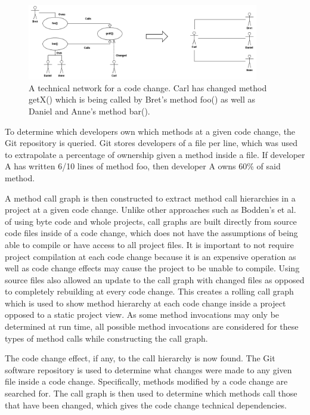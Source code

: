 \begin{figure}[ht]
\centering
\includegraphics[width=0.9\textwidth]{figures/TecNetwork}
\caption{A technical network for a code change. Carl has changed method getX() which is being
called by Bret's method foo() as well as Daniel and Anne's method bar().\label{fig:network}}
\end{figure}

To determine which developers own which methods at a given code change,
the Git repository is queried. Git stores developers of a file per line, which was used to extrapolate
a percentage of ownership given a method inside a file. If developer A has written 6/10 lines of 
method foo, then developer A owns 60\% of said method.

A method call graph is then constructed to extract method call hierarchies in a project at a given code change. 
Unlike other approaches such as Bodden's et al.~\cite{Bodden:2003:HVJ} 
of using byte code and whole projects, call graphs are built directly from source code files
inside of a code change, 
which does not have the assumptions of being able to compile or have access to all project 
files. It is important to not require project compilation at each code change because it is
an expensive operation as well as code change effects may cause the project
to be unable to compile. Using source files also allowed an update to the call graph
with changed files as opposed to completely rebuilding at 
every code change. This creates a rolling call graph which 
is used to show method hierarchy at each code change inside a project opposed to
a static project view. As some method invocations may only be determined at run time, all
possible method invocations are considered for these types of method calls while constructing
the call graph.

The code change effect, if any, to the call hierarchy is now found. The Git
software repository is used to determine what changes were made to any given file inside a 
code change. Specifically, methods modified by a code change are searched for. The call graph 
is then used to determine which methods call those that have been changed, which
gives the code change technical dependencies.

